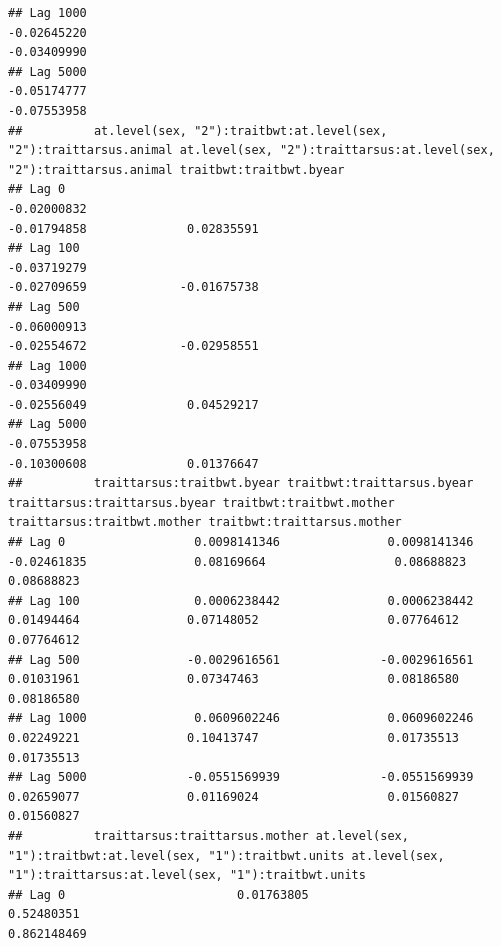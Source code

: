 \documentclass[
  12pt,
]{book}
\begin{document}
\begin{verbatim}
## Lag 1000                                                    -0.02645220                                                       -0.03409990
## Lag 5000                                                    -0.05174777                                                       -0.07553958
##          at.level(sex, "2"):traitbwt:at.level(sex, "2"):traittarsus.animal at.level(sex, "2"):traittarsus:at.level(sex, "2"):traittarsus.animal traitbwt:traitbwt.byear
## Lag 0                                                          -0.02000832                                                          -0.01794858              0.02835591
## Lag 100                                                        -0.03719279                                                          -0.02709659             -0.01675738
## Lag 500                                                        -0.06000913                                                          -0.02554672             -0.02958551
## Lag 1000                                                       -0.03409990                                                          -0.02556049              0.04529217
## Lag 5000                                                       -0.07553958                                                          -0.10300608              0.01376647
##          traittarsus:traitbwt.byear traitbwt:traittarsus.byear traittarsus:traittarsus.byear traitbwt:traitbwt.mother traittarsus:traitbwt.mother traitbwt:traittarsus.mother
## Lag 0                  0.0098141346               0.0098141346                   -0.02461835               0.08169664                  0.08688823                  0.08688823
## Lag 100                0.0006238442               0.0006238442                    0.01494464               0.07148052                  0.07764612                  0.07764612
## Lag 500               -0.0029616561              -0.0029616561                    0.01031961               0.07347463                  0.08186580                  0.08186580
## Lag 1000               0.0609602246               0.0609602246                    0.02249221               0.10413747                  0.01735513                  0.01735513
## Lag 5000              -0.0551569939              -0.0551569939                    0.02659077               0.01169024                  0.01560827                  0.01560827
##          traittarsus:traittarsus.mother at.level(sex, "1"):traitbwt:at.level(sex, "1"):traitbwt.units at.level(sex, "1"):traittarsus:at.level(sex, "1"):traitbwt.units
## Lag 0                        0.01763805                                                    0.52480351                                                      0.862148469

\end{verbatim}
\end{document}
